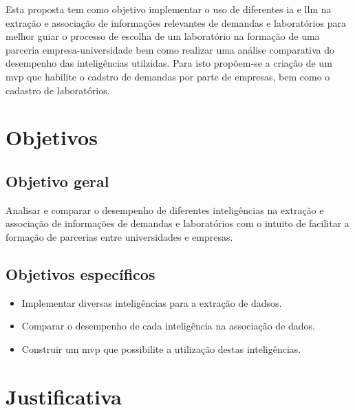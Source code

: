 Esta proposta tem como objetivo implementar o uso de diferentes \gls{ia} e \gls{llm} na extração e associação de informações relevantes de demandas e laboratórios para melhor guiar o processo de escolha de um laboratório na formação de uma parceria empresa-universidade bem como realizar uma análise comparativa do desempenho das inteligências utilzidas. Para isto propõem-se a criação de um \gls{mvp} que habilite o cadstro de demandas por parte de empresas, bem como o cadastro de laboratórios.

\section{Objetivos}\label{sec:objetivos}

\subsection{Objetivo geral}\label{subsec:objetivoGeral}

Analisar e comparar o desempenho de diferentes inteligências na extração e associação de informações de demandas e laboratórios com o intuito de facilitar a formação de parcerias entre universidades e empresas.

\subsection{Objetivos específicos}\label{subsec:objetivosEspecificos}

\begin{itemize}
    \item Implementar diversas inteligências para a extração de dadsos.
    \item Comparar o desempenho de cada inteligência na associação de dados.
    \item Construir um \gls{mvp} que possibilite a utilização destas inteligências.
\end{itemize}

\section{Justificativa}\label{sec:justificativa}

